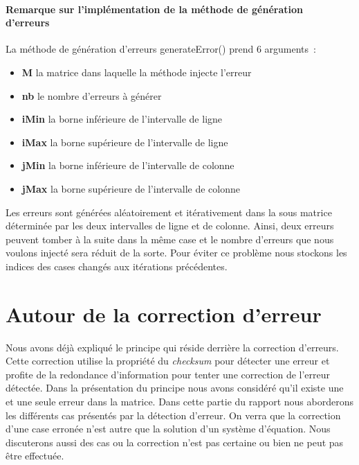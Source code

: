 \documentclass[a4paper,10pt]{report}
\begin{document}
\subsubsection{Remarque  sur l’implémentation de la méthode de génération d’erreurs }
La méthode de génération d’erreurs generateError() prend 6 arguments :
\begin{itemize}
 \item \textbf{M} la matrice dans laquelle la méthode injecte l'erreur
 \item \textbf{nb} le nombre d'erreurs à générer
 \item \textbf{iMin} la borne inférieure de l'intervalle de ligne
 \item \textbf{iMax} la borne supérieure de l'intervalle de ligne
 \item \textbf{jMin} la borne inférieure de l'intervalle de colonne
 \item \textbf{jMax} la borne supérieure de l'intervalle de colonne
\end{itemize}
Les erreurs sont générées aléatoirement et itérativement dans la sous matrice déterminée par les deux intervalles de 
ligne et de colonne. Ainsi, deux erreurs peuvent tomber à la suite dans la même case et le nombre d’erreurs que nous 
voulons injecté sera réduit de la sorte. Pour éviter ce problème nous stockons les indices des cases changés aux 
itérations précédentes.

\chapter{Autour de la correction d'erreur}
Nous avons déjà expliqué le principe qui réside derrière la correction d’erreurs. Cette correction utilise la propriété 
du \textit{checksum} pour détecter une erreur et profite de la redondance d’information pour tenter une correction de 
l’erreur détectée. Dans la présentation du principe nous avons considéré qu’il existe une et une seule erreur dans la matrice. 
Dans cette partie du rapport nous aborderons les différents cas présentés par la détection d’erreur. On verra que la 
correction d’une case erronée n’est autre que la solution d’un système d’équation. Nous discuterons aussi des cas ou 
la correction n’est pas certaine ou bien ne peut pas être effectuée.
\end{document}
